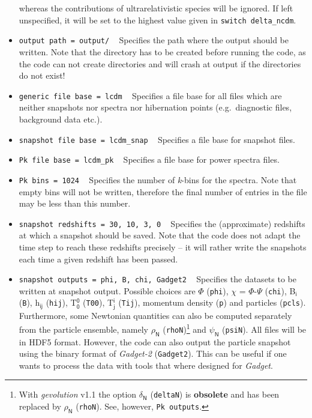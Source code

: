 \documentclass[a4paper,10pt]{article}
\begin{document}
\begin{itemize}
 whereas the contributions of ultrarelativistic species will be ignored. If left unspecified, it will be set to the highest value given
 in \texttt{switch delta\_ncdm}.
 \item[] \hspace{-25pt}\texttt{output path = output/} ~ Specifies the path where the output should be written. Note that the directory has
 to be created before running the code, as the code can not create directories and will crash at output if the directories do not exist!
 \item[] \hspace{-25pt}\texttt{generic file base = lcdm} ~ Specifies a file base for all files which are neither snapshots nor spectra
 nor hibernation points (e.g.\ diagnostic files, background data etc.).
 \item[] \hspace{-25pt}\texttt{snapshot file base = lcdm\_snap} ~ Specifies a file base for snapshot files.
 \item[] \hspace{-25pt}\texttt{Pk file base = lcdm\_pk} ~ Specifies a file base for power spectra files.
 \item[] \hspace{-25pt}\texttt{Pk bins = 1024} ~ Specifies the number of \textit{k}-bins for the spectra. Note that empty bins will not be
 written, therefore the final number of entries in the file may be less than this number.
 \item[] \hspace{-25pt}\texttt{snapshot redshifts  = 30, 10, 3, 0} ~ Specifies the (approximate) redshifts at which a snapshot should be
 saved. Note that the code does not adapt the time step to reach these redshifts precisely -- it will rather write the snapshots each time a
 given redshift has been passed.
 \item[] \hspace{-25pt}\texttt{snapshot outputs = phi, B, chi, Gadget2} ~ Specifies the datasets to be written at snapshot output. Possible
 choices are $\mathsf{\Phi}$ (\texttt{phi}), $\mathsf{\chi}$ = $\mathsf{\Phi}$-$\mathsf{\Psi}$ (\texttt{chi}), B$_\mathsf{i}$ (\texttt{B}),
 h$_\mathsf{ij}$ (\texttt{hij}), T$^\mathsf{0}_\mathsf{0}$ (\texttt{T00}), T$^\mathsf{i}_\mathsf{j}$ (\texttt{Tij}), momentum density
 (\texttt{p}) and particles (\texttt{pcls}). Furthermore, some Newtonian quantities can also be computed separately from the particle
 ensemble, namely $\mathsf{\rho}_\mathsf{N}$ (\texttt{rhoN})\footnote{With \textit{gevolution} v1.1 the option  $\mathsf{\delta}_\mathsf{N}$
 (\texttt{deltaN}) is \textbf{obsolete} and has been replaced by $\mathsf{\rho}_\mathsf{N}$ (\texttt{rhoN}). See, however, \texttt{Pk
 outputs}.} and $\mathsf{\psi}_\mathsf{N}$ (\texttt{psiN}). All files will be in HDF5 format. However, the code can also output the particle
 snapshot using the binary format of \textit{Gadget-2} (\texttt{Gadget2}). This can be useful if one 
wants to process the data with tools that where designed for \textit{Gadget}.
 

\end{itemize}
\end{document}
